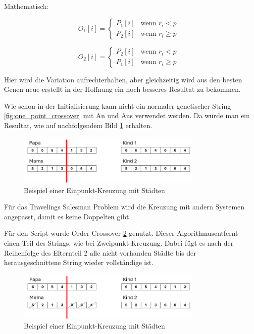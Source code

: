 Mathematisch:

\[ O_1[i] = \begin{cases} 
P_1[i] & \text{wenn } r_i < p \\
P_2[i] & \text{wenn } r_i \geq p 
\end{cases} \]

\[ O_2[i] = \begin{cases} 
P_2[i] & \text{wenn } r_i < p \\
P_1[i] & \text{wenn } r_i \geq p 
\end{cases} \]

Hier wird die Variation aufrechterhalten, aber gleichzeitig 
wird aus den besten Genen neue erstellt in der Hoffnung ein 
noch besseres Resultat zu bekommen.

Wie schon in der Initialisierung kann nicht ein normaler 
genetischer String \ref{fig:one_point_crossover} mit An und 
Aus verwendet werden. Da würde man ein Resultat, wie auf 
nachfolgendem Bild \ref{fig:one_point_crossover_cities} erhalten.

\begin{figure} [h]
	\centering
	\includegraphics[width=0.8\textwidth]{
        papers/variationsprinzip_algorithmen/images/teil3/07_genetic_string_cities_crossover_standard.png
        }
	\caption{Beispiel einer Einpunkt-Kreuzung mit Städten}
	\label{fig:one_point_crossover_cities}
\end{figure}

Für das Travelings Salesman Problem wird die Kreuzung mit andern Systemen 
angepasst, damit es keine Doppelten gibt.

Für den Script wurde Order Crossover \ref{fig:crossover_order_cities} genutzt.
Dieser Algorithmusentfernt einen Teil des Strings, wie bei Zweipunkt-Kreuzung. 
Dabei fügt es nach der Reihenfolge des Elternteil 2 alle nicht vorhanden 
Städte bis der herausgeschnittene String wieder vollständige ist.

\begin{figure} [h]
	\centering
	\includegraphics[width=0.8\textwidth]{
        papers/variationsprinzip_algorithmen/images/teil3/08_genetic_string_cities_crossover_simple.png
        }
	\caption{Beispiel einer Einpunkt-Kreuzung mit Städten}
	\label{fig:crossover_order_cities}
\end{figure}


